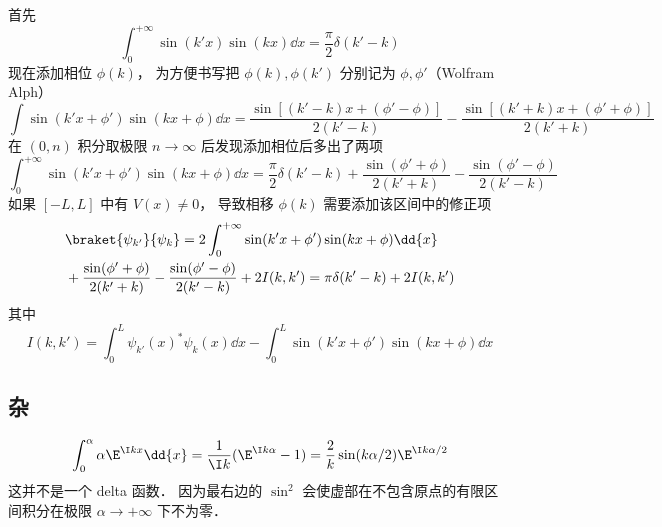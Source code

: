 首先
\begin{equation}
\int_{0}^{+\infty} \sin(k'x)\sin(kx)\dd{x} = \frac{\pi}{2}\delta(k'-k)
\end{equation}
现在添加相位 $\phi(k)$， 为方便书写把 $\phi(k),\phi(k')$ 分别记为 $\phi, \phi'$（Wolfram Alph）
\begin{equation}
\int \sin(k'x+\phi')\sin(kx+\phi) \dd{x} = \frac{\sin[(k'-k)x + (\phi'-\phi)]}{2(k'-k)}
- \frac{\sin[(k'+k)x+(\phi'+\phi)]}{2(k'+k)}
\end{equation}
在 $(0,n)$ 积分取极限 $n\to\infty$ 后发现添加相位后多出了两项
\begin{equation}
\int_{0}^{+\infty} \sin(k'x+\phi')\sin(kx+\phi) \dd{x} = \frac{\pi}{2}\delta(k'-k)
+ \frac{\sin(\phi'+\phi)}{2(k'+k)} - \frac{\sin(\phi'-\phi)}{2(k'-k)}
\end{equation}
如果 $[-L,L]$ 中有 $V(x) \ne 0$， 导致相移 $\phi(k)$ 需要添加该区间中的修正项
\begin{equation}
\begin{aligned}
&\braket{\psi_{k'}}{\psi_k} = 2\int_{0}^{+\infty} \sin(k'x+\phi')\sin(kx+\phi) \dd{x}\\
&+ \frac{\sin(\phi'+\phi)}{2(k'+k)} - \frac{\sin(\phi'-\phi)}{2(k'-k)} + 2I(k,k')
= \pi\delta(k'-k) + 2I(k,k')
\end{aligned}
\end{equation}
其中
\begin{equation}
I(k,k') = \int_0^L \psi_{k'}(x)^* \psi_k(x) \dd{x}
-\int_{0}^{L} \sin(k'x+\phi')\sin(kx+\phi) \dd{x}
\end{equation}

\subsection{杂}
\begin{equation}
\int_0^\alpha\alpha \E^{\I kx} \dd{x} = \frac{1}{\I k} (\E^{\I k\alpha} - 1)
= \frac{2}{ k} \sin(k\alpha/2) \E^{\I k\alpha/2}
\end{equation}
这并不是一个 delta 函数． 因为最右边的 $\sin^2$ 会使虚部在不包含原点的有限区间积分在极限 $\alpha \to +\infty$ 下不为零．

